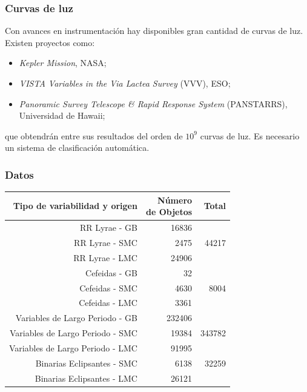 \documentclass{beamer}
\begin{document}
\begin{frame}
  \frametitle{Curvas de luz}
  Con avances en instrumentación hay disponibles gran cantidad de curvas de luz. Existen proyectos como:
  \begin{itemize}
  \item \textit{Kepler Mission}, NASA;
  \item \textit{VISTA Variables in the Via Lactea Survey} (VVV), ESO;
  \item \textit{Panoramic Survey Telescope \& Rapid Response System} (PANSTARRS), Universidad de Hawaii;
  \end{itemize}
  que obtendrán entre sus resultados del orden de $10^9$ curvas de luz. Es necesario un sistema de clasificación automática.
\end{frame}

\begin{frame}
  \frametitle{Datos}
  \begin{table}
    \centering  
    \resizebox{0.6\textwidth}{!} {
      \begin{tabular}{rrr}
        \hline
        \hline
        Tipo de variabilidad y origen & \shortstack{Número \\de Objetos} & Total \\
        \hline
        \hline 
        RR Lyrae - GB\cite{soszynski_optical_2011-2} & 16836& \\
        RR Lyrae - SMC \cite{soszynski_optical_2010}& 2475&  44217\\
        RR Lyrae - LMC \cite{soszynski_optical_2009-1}& 24906& \\
        \hline
        Cefeidas - GB \cite{soszynski_optical_2011}& 32 & \\%
        Cefeidas - SMC \cite{soszynski_optical_2010-2}& 4630 & 8004\\
        Cefeidas - LMC \cite{soszynski_optical_2008-1}& 3361 & \\
        \hline
        Variables de Largo Periodo - GB \cite{soszynski_optical_2013-1}& 232406 & \\
        Variables de Largo Periodo - SMC \cite{soszynski_optical_2011-1}& 19384 & 343782\\
        Variables de Largo Periodo -  LMC\cite{soszynski_optical_2009}& 91995 & \\
        \hline
        Binarias Eclipsantes - SMC \cite{pawlak_eclipsing_2013}& 6138 & 32259\\
        Binarias Eclipsantes - LMC \cite{graczyk_optical_2011}& 26121 & \\

\end{tabular}}
\end{table}
\end{frame}
\end{document}
